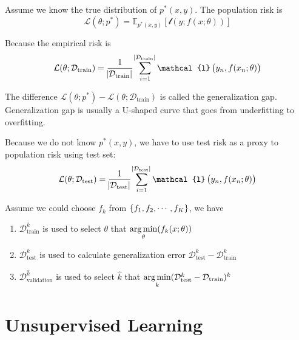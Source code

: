\begin{definition}
    Assume we know the true distribution of $p^*(x,y)$. The population risk is
    \begin{equation}
        \mathcal{L}(\theta;p^*) = \mathbb{E}_{p^*(x,y)}\left[\mathcal{l}\left(y; f(x;\theta) \right)\right]
    \end{equation}
\end{definition}

\begin{definition}
    Because the empirical risk is 
    \begin{equation}
        \mathcal{L}(\theta;\mathcal{D}_{\text{train}}) = \frac{1}{\absolutevalue{\mathcal{D}_{\text{train}}}} \sum_{i=1}^{\absolutevalue{\mathcal{D}_{\text{train}}}} \mathcal{l}\left( y_n, f(x_n; \theta) \right)
    \end{equation}
    
    The difference $\mathcal{L}(\theta;p^*) - \mathcal{L}(\theta;\mathcal{D}_{\text{train}})$ is called the generalization gap. Generalization gap is usually a U-shaped curve that goes from underfitting to overfitting.
    
    Because we do not know $p^*(x,y)$, we have to use test risk as a proxy to population risk using test set:
    \begin{equation}
        \mathcal{L}(\theta;\mathcal{D}_{\text{test}}) = \frac{1}{\absolutevalue{\mathcal{D}_{\text{test}}}} \sum_{i=1}^{\absolutevalue{\mathcal{D}_{\text{test}}}} \mathcal{l}\left( y_n, f(x_n; \theta) \right)
    \end{equation}
\end{definition}

Assume we could choose $f_k$ from $\set{f_1, f_2, \cdots, f_K}$, we have
\begin{enumerate}
    \item $\mathcal{D}_{\text{train}}^k$ is used to select $\theta$ that $\mathop{\arg\min}\limits_{\theta}(f_k(x;\theta))$
    \item $\mathcal{D}_{\text{test}}^k$ is used to calculate generalization error $\mathcal{D}_{\text{test}}^k - \mathcal{D}_{\text{train}}^k$
    \item $\mathcal{D}_{\text{validation}}^{\hat{k}}$ is used to select $\hat{k}$ that $\mathop{\arg\min}\limits_{k}(\mathcal{D}_{\text{test}}^k - \mathcal{D}_{\text{train}})^k$
\end{enumerate}


\section{Unsupervised Learning}

